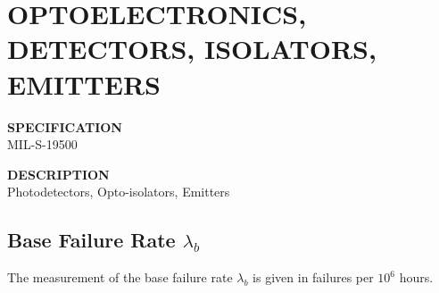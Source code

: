 \section{OPTOELECTRONICS, DETECTORS, ISOLATORS, EMITTERS}

\begin{minipage}[t]{0.29\textwidth}
    \textbf{SPECIFICATION}\\
    MIL-S-19500
\end{minipage}
\begin{minipage}[t]{0.7\textwidth}
    \textbf{DESCRIPTION}\\
    {\fontsize{12pt}{12pt}\selectfont Photodetectors, Opto-isolators, Emitters}
\end{minipage}

\subsection{Base Failure Rate $\lambda_b$}
The measurement of the base failure rate $\lambda_b$ is given in failures per $10^6$ hours.

